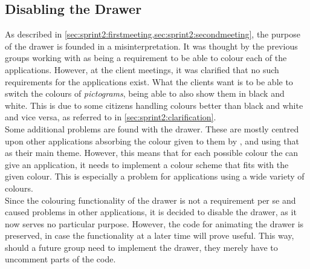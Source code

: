 \subsection{Disabling the Drawer}
As described in \cref{sec:sprint2:firstmeeting,sec:sprint2:secondmeeting}, the purpose of the drawer is founded in a misinterpretation.
It was thought by the previous groups working with \launcher as being a requirement to be able to colour each of the \giraf applications.
However, at the client meetings, it was clarified that no such requirements for the applications exist.
What the clients want is to be able to switch the colours of \textit{pictograms}, being able to also show them in black and white.
This is due to some citizens handling colours better than black and white and vice versa, as referred to in \cref{sec:sprint2:clarification}.\\

Some additional problems are found with the drawer.
These are mostly centred upon other applications absorbing the colour given to them by \launcher, and using that as their main theme.
However, this means that for each possible colour the \launcher can give an application, it needs to implement a colour scheme that fits with the given colour.
This is especially a problem for applications using a wide variety of colours.\\

Since the colouring functionality of the drawer is not a requirement per se and caused problems in other applications, it is decided to disable the drawer, as it now serves no particular purpose.
However, the code for animating the drawer is preserved, in case the functionality at a later time will prove useful.
This way, should a future group need to implement the drawer, they merely have to uncomment parts of the code.